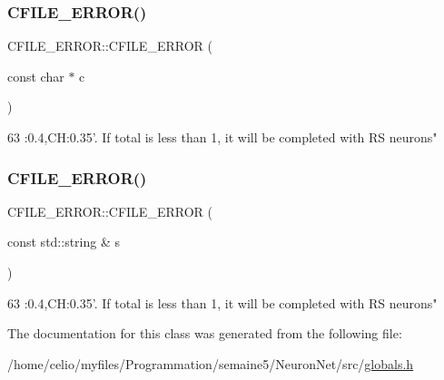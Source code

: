 \subsubsection{\texorpdfstring{C\+F\+I\+L\+E\+\_\+\+E\+R\+R\+O\+R()}{CFILE\_ERROR()}\hspace{0.1cm}{\footnotesize\ttfamily [1/2]}}
{\footnotesize\ttfamily C\+F\+I\+L\+E\+\_\+\+E\+R\+R\+O\+R\+::\+C\+F\+I\+L\+E\+\_\+\+E\+R\+R\+OR (\begin{DoxyParamCaption}\item[{const char $\ast$}]{c }\end{DoxyParamCaption})\hspace{0.3cm}{\ttfamily [inline]}}


\begin{DoxyCode}
63 :0.4,CH:0.35\textcolor{stringliteral}{'. If total is less than 1, it will be completed with RS neurons"}
\end{DoxyCode}
\mbox{\label{classCFILE__ERROR_a20393787ce4998a586a518f0478de5f3}} 
\subsubsection{\texorpdfstring{C\+F\+I\+L\+E\+\_\+\+E\+R\+R\+O\+R()}{CFILE\_ERROR()}\hspace{0.1cm}{\footnotesize\ttfamily [2/2]}}
{\footnotesize\ttfamily C\+F\+I\+L\+E\+\_\+\+E\+R\+R\+O\+R\+::\+C\+F\+I\+L\+E\+\_\+\+E\+R\+R\+OR (\begin{DoxyParamCaption}\item[{const std\+::string \&}]{s }\end{DoxyParamCaption})\hspace{0.3cm}{\ttfamily [inline]}}


\begin{DoxyCode}
63 :0.4,CH:0.35\textcolor{stringliteral}{'. If total is less than 1, it will be completed with RS neurons"}
\end{DoxyCode}


The documentation for this class was generated from the following file\+:\begin{DoxyCompactItemize}
\item 
/home/celio/myfiles/\+Programmation/semaine5/\+Neuron\+Net/src/\hyperlink{globals_8h}{globals.\+h}\end{DoxyCompactItemize}
